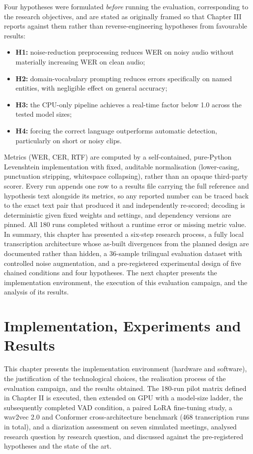 \documentclass[12pt]{report}
\begin{document}
Four hypotheses were formulated \emph{before} running the evaluation, corresponding to the research objectives, and are stated as originally framed so that Chapter III reports against them rather than reverse-engineering hypotheses from favourable results:
\begin{itemize}
    \item \textbf{H1:} noise-reduction preprocessing reduces WER on noisy audio without materially increasing WER on clean audio;
    \item \textbf{H2:} domain-vocabulary prompting reduces errors specifically on named entities, with negligible effect on general accuracy;
    \item \textbf{H3:} the CPU-only pipeline achieves a real-time factor below 1.0 across the tested model sizes;
    \item \textbf{H4:} forcing the correct language outperforms automatic detection, particularly on short or noisy clips.
\end{itemize}
Metrics (WER, CER, RTF) are computed by a self-contained, pure-Python Levenshtein implementation with fixed, auditable normalisation (lower-casing, punctuation stripping, whitespace collapsing), rather than an opaque third-party scorer. Every run appends one row to a results file carrying the full reference and hypothesis text alongside its metrics, so any reported number can be traced back to the exact text pair that produced it and independently re-scored; decoding is deterministic given fixed weights and settings, and dependency versions are pinned. All 180 runs completed without a runtime error or missing metric value.
\vspace{0.5em}
In summary, this chapter has presented a six-step research process, a fully local transcription architecture whose as-built divergences from the planned design are documented rather than hidden, a 36-sample trilingual evaluation dataset with controlled noise augmentation, and a pre-registered experimental design of five chained conditions and four hypotheses. The next chapter presents the implementation environment, the execution of this evaluation campaign, and the analysis of its results.
\chapter{Implementation, Experiments and Results}
This chapter presents the implementation environment (hardware and software), the justification of the technological choices, the realisation process of the evaluation campaign, and the results obtained. The 180-run pilot matrix defined in Chapter II is executed, then extended on GPU with a model-size ladder, the subsequently completed VAD condition, a paired LoRA fine-tuning study, a wav2vec 2.0 and Conformer cross-architecture benchmark (468 transcription runs in total), and a diarization assessment on seven simulated meetings, analysed research question by research question, and discussed against the pre-registered hypotheses and the state of the art.
\end{document}
